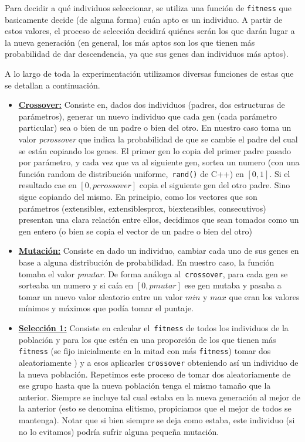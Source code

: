 \documentclass[A4paper,oneside,fleqn,11pt]{article}
\theoremstyle{definition}
\begin{document}
Para decidir a qué individuos seleccionar, se utiliza una función de \texttt{fitness} que basicamente decide (de alguna forma) cuán apto es un individuo. A partir de estos valores, el proceso de selección decidirá quiénes serán los que darán lugar a la nueva generación (en general, los más aptos son los que tienen más probabilidad de dar descendencia, ya que sus genes dan individuos más aptos).

A lo largo de toda la experimentación utilizamos diversas funciones de estas que se detallan a continuación.

\begin{itemize}
\item \textbf{\underline{Crossover:}} Consiste en, dados dos individuos (padres, dos estructuras de parámetros), generar un nuevo individuo que cada gen (cada parámetro particular) sea o bien de un padre o bien del otro. En nuestro caso toma un valor\textit{ pcrossover} que indica la probabilidad de que se cambie el padre del cual se están copiando los genes. El primer gen lo copia del primer padre pasado por parámetro, y cada vez que va al siguiente gen, sortea un numero (con una función random de distribución uniforme,\texttt{ rand()} de C++) en $[0,1]$. Si el resultado cae en $[0,pcrossover]$ copia el siguiente gen del otro padre. Sino sigue copiando del mismo. En principio, como los vectores que son parámetros (extensibles, extensiblesprox, biextensibles, consecutivos) presentan una clara relación entre ellos, decidimos que sean tomados como un gen entero (o bien se copia el vector de un padre o bien del otro)

\item \textbf{\underline{Mutación:}} Consiste en dado un individuo, cambiar cada uno de sus genes en base a alguna distribución de probabilidad. En nuestro caso, la función tomaba el valor\textit{ pmutar}. De forma análoga al\texttt{ crossover}, para cada gen se sorteaba un numero y si caía en $[0,pmutar]$ ese gen mutaba y pasaba a tomar un nuevo valor aleatorio entre un valor $min$ y $max$ que eran los valores mínimos y máximos que podía tomar el puntaje.


\item \textbf{\underline{Selección 1:}} Consiste en calcular el\texttt{ fitness} de todos los individuos de la población y para los que estén en una proporción de los que tienen más \texttt{fitness} (se fijo inicialmente en la mitad con más \texttt{fitness}) tomar dos aleatoriamente %
) y a esos aplicarles \texttt{crossover} obteniendo así un individuo de la nueva población. Repetimos este proceso de tomar dos aleatoriamente de ese grupo hasta que la nueva población tenga el mismo tamaño que la anterior. Siempre se incluye tal cual estaba en la nueva generación al mejor de la anterior (esto se denomina elitismo, propiciamos que el mejor de todos se mantenga). Notar que si bien siempre se deja como estaba, este individuo (si no lo evitamos) podría sufrir alguna pequeña mutación.


\end{itemize}
\end{document}
